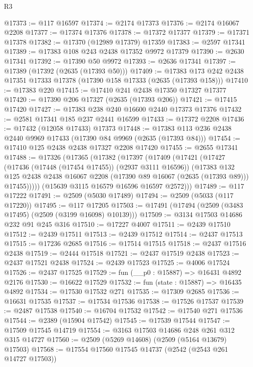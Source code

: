 \begin{lexlean}{R3}
\begin{coremodule}
@17373 := @117 @16597
@17374 := @2174 @17373
@17376 := @2174 @16067 @2208
@17377 := @17374 @17376
@17378 := @17372 @17377
@17379 := @17371 @17378
@17382 := @17370 (@12989 @17379) @17359
@17383 := @2597 @17341
@17389 := @17383 @108 @243 @2438 @17352 @9972 @17379
@17390 := @2630 @17341
@17392 := @17390 @50 @9972
@17393 := @2636 @17341
@17397 := @17389 (@17392 (@2635 (@17393 @50)))
@17409 := @17383 @173 @242 @2438 @17351 @17333 @17378 (@17390 @158 @17333 (@2635 (@17393 @158)))
@17410 := @17383 @220
@17415 := @17410 @241 @2438 @17350 @17327 @17377
@17420 := @17390 @206 @17327 (@2635 (@17393 @206))
@17421 := @17415 @17420
@17427 := @17383 @238 @240 @16600 @2440 @17373 @17376
@17432 := @2581 @17341 @185 @237 @2441 @16599
@17433 := @17372 @2208
@17436 := @17432 (@12058 @17433) @17373
@17448 := @17383 @113 @236 @2438 @2440 @9969 @17433 (@17390 @84 @9969 (@2635 (@17393 @84)))
@17454 := @17410 @125 @2438 @2438 @17327 @2208 @17420
@17455 := @2655 @17341
@17488 := @17326
    (@17365
      (@17382
        (@17397
          (@17409
            (@17421
              (@17427
                (@17436 (@17448 (@17454 @17455)) (@2937 @3111 @16596))
                (@17383
                  @132
                  @125
                  @2438
                  @2438
                  @16067
                  @2208
                  (@17390 @89 @16067 (@2635 (@17393 @89)))
                  @17455)))))
        (@15639 @3115 @16579 @16596 @16597 @2572)))
@17489 := @117 @17222
@17491 := @2509 (@5030 @17489)
@17494 := @2509 (@5033 (@117 @17220))
@17495 := @117 @17205
@17503 := @17491 (@17494 (@2509 (@3483 @17495) (@2509 (@3199 @16098) @10139)))
@17509 := @3134 @17503 @14686 @232 @91 @245 @316
@17510 := @17227 @4007
@17511 := @2439 @17510
@17512 := @2439 @17511
@17513 := @2439 @17512
@17514 := @2437 @17513
@17515 := @17236 @2685
@17516 := @17514 @17515
@17518 := @2437 @17516 @2438
@17519 := @2444 @17518
@17521 := @2437 @17519 @2438
@17523 := @2437 @17521 @2438
@17524 := @2439 @17523
@17525 := @4006 @17524
@17526 := @2437 @17525
@17529 := fun (__p0 : @15887) => @16431 @4892 @2176
@17530 := @16622 @17529
@17532 := fun (state : @15887) => @16435 @4892
@17534 := @17530 @17532 @271
@17535 := @17309 @2685
@17536 := @16631 @17535
@17537 := @17534 @17536
@17538 := @17526 @17537
@17539 := @2487 @17538
@17540 := @16704 @17532
@17542 := @17540 @271 @17536
@17544 := @2389 (@15904 @17542)
@17545 := @17539 @17544
@17547 := @17509 @17545 @14719
@17554 := @3163 @17503 @14686 @248 @261 @312 @315 @14727
@17560 := @2509 (@5269 @14608) (@2509 (@5164 @13679) @17503)
@17568 := @17554 @17560 @17545 @14737 (@2542 (@2543 @261 @14727 @17503))

\end{coremodule}
\end{lexlean}
